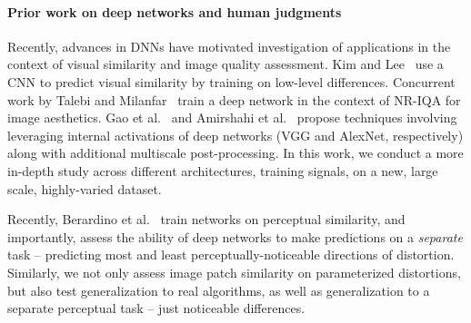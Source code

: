 \paragraph{Prior work on deep networks and human judgments} Recently, advances in DNNs have motivated investigation of applications in the context of visual similarity and image quality assessment. 
Kim and Lee~\cite{kim2017deep} use a CNN to predict visual similarity by training on low-level differences. Concurrent work by Talebi and Milanfar~\cite{talebi2017learned,talebi2018nima} train a deep network in the context of NR-IQA for image aesthetics. Gao et al.~\cite{gao2017deepsim} and Amirshahi et al.~\cite{ali2017image} propose techniques involving leveraging internal activations of deep networks (VGG and AlexNet, respectively) along with additional multiscale post-processing. In this work, we conduct a more in-depth study across different architectures, training signals, on a new, large scale, highly-varied dataset.

Recently, Berardino et al.~\cite{berardino2017eigen} train networks on perceptual similarity, and importantly, assess the ability of deep networks to make predictions on a \textit{separate} task -- predicting most and least perceptually-noticeable directions of distortion. Similarly, we not only assess image patch similarity on parameterized distortions, but also test generalization to real algorithms, as well as generalization to a separate perceptual task -- just noticeable differences.